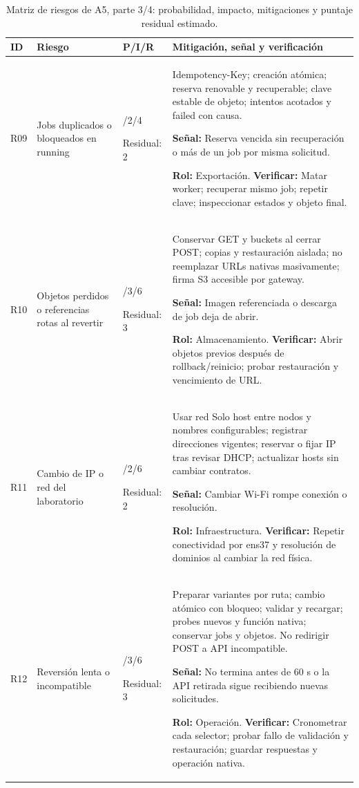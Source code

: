 \clearpage
\begin{table}[H]
\centering\small
\setlength{\tabcolsep}{4pt}
\renewcommand{\arraystretch}{1.10}
\caption{Matriz de riesgos de A5, parte 3/4: probabilidad, impacto, mitigaciones y puntaje residual estimado.}\label{tab:a5-riesgos-3}
\begin{tabularx}{\textwidth}{>{\raggedright\arraybackslash}p{0.75cm} >{\raggedright\arraybackslash}p{2.8cm} >{\raggedright\arraybackslash}p{1.8cm} >{\raggedright\arraybackslash}X}
\toprule
\textbf{ID} & \textbf{Riesgo} & \textbf{P/I/R} & \textbf{Mitigación, señal y verificación} \\
\midrule
R09 & Jobs duplicados o bloqueados en running & 2/2/4\par Residual: 2 & Idempotency-Key; creación atómica; reserva renovable y recuperable; clave estable de objeto; intentos acotados y failed con causa.\par\textbf{Señal:} Reserva vencida sin recuperación o más de un job por misma solicitud.\par\textbf{Rol:} Exportación. \textbf{Verificar:} Matar worker; recuperar mismo job; repetir clave; inspeccionar estados y objeto final. \\[4pt]
R10 & Objetos perdidos o referencias rotas al revertir & 2/3/6\par Residual: 3 & Conservar GET y buckets al cerrar POST; copias y restauración aislada; no reemplazar URLs nativas masivamente; firma S3 accesible por gateway.\par\textbf{Señal:} Imagen referenciada o descarga de job deja de abrir.\par\textbf{Rol:} Almacenamiento. \textbf{Verificar:} Abrir objetos previos después de rollback/reinicio; probar restauración y vencimiento de URL. \\[4pt]
R11 & Cambio de IP o red del laboratorio & 3/2/6\par Residual: 2 & Usar red Solo host entre nodos y nombres configurables; registrar direcciones vigentes; reservar o fijar IP tras revisar DHCP; actualizar hosts sin cambiar contratos.\par\textbf{Señal:} Cambiar Wi-Fi rompe conexión o resolución.\par\textbf{Rol:} Infraestructura. \textbf{Verificar:} Repetir conectividad por ens37 y resolución de dominios al cambiar la red física. \\[4pt]
R12 & Reversión lenta o incompatible & 2/3/6\par Residual: 3 & Preparar variantes por ruta; cambio atómico con bloqueo; validar y recargar; probes nuevos y función nativa; conservar jobs y objetos. No redirigir POST a API incompatible.\par\textbf{Señal:} No termina antes de 60 s o la API retirada sigue recibiendo nuevas solicitudes.\par\textbf{Rol:} Operación. \textbf{Verificar:} Cronometrar cada selector; probar fallo de validación y restauración; guardar respuestas y operación nativa. \\[4pt]
\bottomrule
\end{tabularx}
\end{table}
